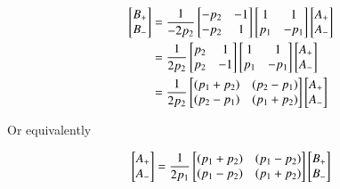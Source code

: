 \documentclass{article}
\begin{document}
\begin{align*}
\begin{bmatrix}
B_{+} \\
B_{-}
\end{bmatrix}
&=
\frac{1}{-2p_2}
\begin{bmatrix}
-p_2 & -1 \\
-p_2 & 1
\end{bmatrix}
\begin{bmatrix}
1 & 1 \\
p_1 & -p_1
\end{bmatrix}
\begin{bmatrix}
A_{+} \\
A_{-}
\end{bmatrix} \\
&=
\frac{1}{2p_2}
\begin{bmatrix}
p_2 & 1 \\
p_2 & -1
\end{bmatrix}
\begin{bmatrix}
1 & 1 \\
p_1 & -p_1
\end{bmatrix}
\begin{bmatrix}
A_{+} \\
A_{-}
\end{bmatrix} \\
&=
\frac{1}{2p_2}
\begin{bmatrix}
(p_1 + p_2) & (p_2 - p_1) \\
(p_2 - p_1) & (p_1 + p_2)
\end{bmatrix}
\begin{bmatrix}
A_{+} \\
A_{-}
\end{bmatrix} \\
\end{align*}

Or equivalently

\begin{align*}
\begin{bmatrix}
A_{+} \\
A_{-}
\end{bmatrix}
&=
\frac{1}{2p_1}
\begin{bmatrix}
(p_1 + p_2) & (p_1 - p_2) \\
(p_1 - p_2) & (p_1 + p_2)
\end{bmatrix}
\begin{bmatrix}
B_{+} \\
B_{-}
\end{bmatrix} \\
\end{align*}
\end{document}
